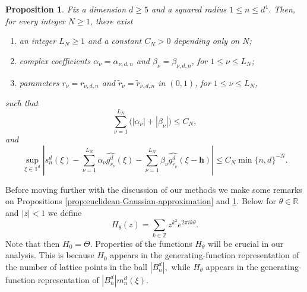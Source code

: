 \documentclass{article}
\newcommand{\R}{\mathbb R}
\theoremstyle{plain}
\newtheorem{proposition}[theorem]{Proposition}
\numberwithin{equation}{section}
\begin{document}
\begin{proposition}\label{prop:sphere-Gaussian-approximation}
Fix a dimension $d\geq 5$ and a squared radius $1\leq n\leq d^4$. Then, for every integer \(N\geq 1\), there exist
\begin{enumerate}
\item an integer \(L_N\geq 1\) and a constant $C_N>0$ depending only on $N$;
\item complex coefficients
\(\alpha_{\nu}=\alpha_{\nu,d,n}\) and \(\beta_{\nu}=\beta_{\nu,d,n}\), for \(1\leq\nu\leq L_N\);
\item parameters
\(r_{\nu}=r_{\nu,d,n}\) and \(\widetilde r_{\nu}=\widetilde r_{\nu,d,n}\) in $(0,1)$, for \(1\leq\nu\leq L_N\),
\end{enumerate}
such that
\begin{equation}\label{eq:sphere-Gaussian-coefficients}
 \sum_{\nu=1}^{L_N}
 \bigl(|\alpha_{\nu}|+|\beta_{\nu}|\bigr)
 \leq C_{N},
\end{equation}
and
\begin{equation}\label{eq:sphere-multiplier-remainder}
 \sup_{\xi\in\mathbb T^d}\left|s_n^d(\xi)-\sum_{\nu=1}^{L_N}\alpha_{\nu}\widehat{g_{r_{\nu}}^d}(\xi)
 -\sum_{\nu=1}^{L_N}\beta_{\nu}
 \widehat{g_{\widetilde r_{\nu}}^d}(\xi-\mathbf h)\right|
 \leq C_{N}\min\{n,d\}^{-N}.
\end{equation}
\end{proposition}
Before moving further with the discussion of our methods we make some remarks on Propositions \ref{prop:euclidean-Gaussian-approximation} and \ref{prop:sphere-Gaussian-approximation}. Below for
$\theta \in \R$ and $|z|<1$ we define
\[
H_\theta(z)=\sum_{k\in\mathbb Z}z^{k^2}e^{2\pi i k\theta}.
\]
Note that then \(H_0=\Theta\). Properties of the functions $H_{\theta}$ will be crucial in our analysis. This is because $H_{0}$ appears in the generating-function representation of the number of lattice points in the ball $|B_n^d|,$ while $H_{\theta}$ appears in the generating-function representation of $|B_n^d|m_n^d(\xi).$
\end{document}
